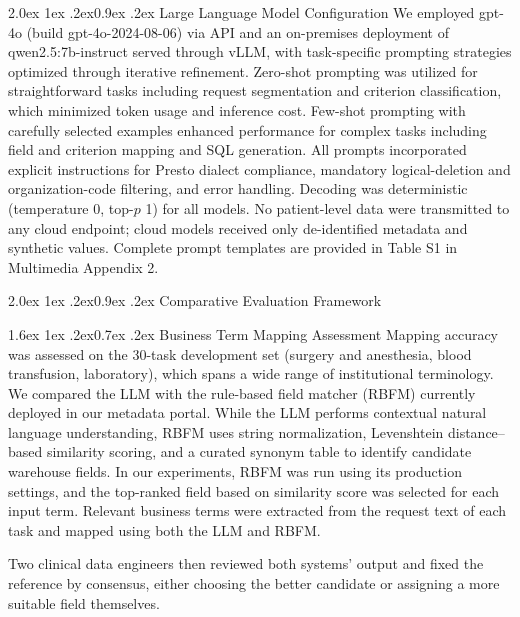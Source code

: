 \documentclass[10pt,twocolumn]{article}
\makeatletter
\renewcommand\subsection{\@startsection{subsection}{2}{\z@}%
  {2.0ex \@plus 1ex \@minus .2ex}{0.9ex \@plus .2ex}%
  {\normalfont\normalsize\bfseries}}
\renewcommand\subsubsection{\@startsection{subsubsection}{3}{\z@}%
  {1.6ex \@plus 1ex \@minus .2ex}{0.7ex \@plus .2ex}%
  {\normalfont\normalsize\itshape}}
\makeatother
\begin{document}
\subsection{Large Language Model Configuration}
We employed gpt-4o (build gpt-4o-2024-08-06) via API and an on-premises deployment of
qwen2.5:7b-instruct served through vLLM, with task-specific prompting strategies
optimized through iterative refinement. Zero-shot prompting was utilized for
straightforward tasks including request segmentation and criterion
classification, which minimized token usage and inference cost. Few-shot
prompting with carefully selected examples enhanced performance for complex
tasks including field and criterion mapping and SQL generation. All prompts
incorporated explicit instructions for Presto dialect compliance, mandatory
logical-deletion and organization-code filtering, and error handling. Decoding
was deterministic (temperature 0, top-$p$ 1) for all models. No patient-level
data were transmitted to any cloud endpoint; cloud models received only
de-identified metadata and synthetic values. Complete prompt templates are
provided in Table S1 in Multimedia Appendix 2.

\subsection{Comparative Evaluation Framework}

\subsubsection{Business Term Mapping Assessment}
Mapping accuracy was assessed on the 30-task development set (surgery and anesthesia, blood transfusion, laboratory), which spans a wide range of institutional terminology. We compared the LLM with the rule-based field matcher (RBFM) currently deployed in our metadata portal. While the LLM
performs contextual natural language understanding, RBFM uses string
normalization, Levenshtein distance--based similarity scoring, and a curated
synonym table to identify candidate warehouse fields. In our experiments, RBFM
was run using its production settings, and the top-ranked field based on
similarity score was selected for each input term. Relevant business terms were
extracted from the request text of each task and mapped using both the LLM and
RBFM.

Two clinical data engineers then reviewed both systems' output and fixed the reference by consensus, either choosing the better candidate or assigning a more suitable field themselves.
\end{document}
